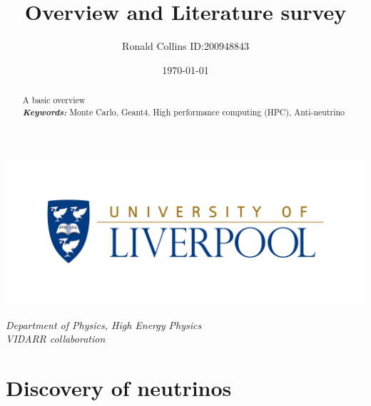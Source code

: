 \documentclass[12pt,a4paper]{article}
\title{Overview and Literature survey}
\date{\today}
\author{Ronald Collins ID:200948843}
\newenvironment{Figure}
  {\par\medskip\noindent\minipage{\linewidth}}
  {\endminipage\par\medskip}
\begin{document}
\maketitle

\begin{Figure}
 \centering
 \includegraphics[width=1.0\linewidth]{Liverpool_logo}
\end{Figure}


\begin{center}
\textit{Department of Physics, High Energy Physics\\}
\textit{VIDARR collaboration\\}
\end{center}


\newpage
{}
\begin{abstract}
\normalsize A basic overview\\

\providecommand{\keywords}[1]{\textbf{\textit{Keywords:}} #1} %
\keywords{Monte Carlo, Geant4, High performance computing (HPC), Anti-neutrino}
\end{abstract}
\vspace{5mm} %
\tableofcontents
\newpage


\section{Discovery of neutrinos}
\end{document}
